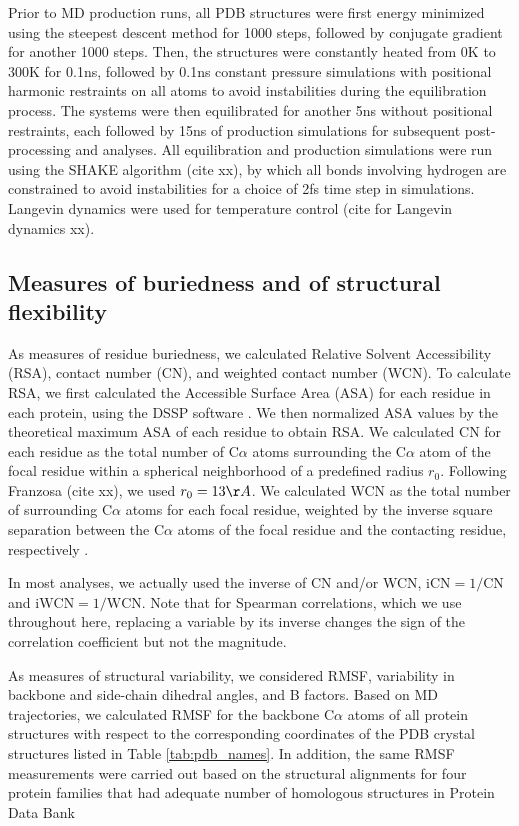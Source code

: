 \documentclass[12pt]{article}
\begin{document}
Prior to MD production runs, all PDB structures were first energy minimized using the steepest descent method for 1000 steps, followed by conjugate gradient for another 1000 steps. Then, the structures were constantly heated from 0K to 300K for 0.1ns, followed by 0.1ns constant pressure simulations with positional harmonic restraints on all atoms to avoid instabilities during the equilibration process. The systems were then equilibrated for another 5ns without positional restraints, each followed by 15ns of production simulations for subsequent post-processing and analyses. All equilibration and production simulations were run using the SHAKE algorithm (cite xx), {\color{blue}by which all bonds involving hydrogen are constrained to avoid instabilities for a choice of 2fs time step in simulations.} Langevin dynamics were used for temperature control (cite for Langevin dynamics xx).

\subsection*{Measures of buriedness and of structural flexibility}

As measures of residue buriedness, we calculated Relative Solvent Accessibility (RSA), contact number (CN), and weighted contact number (WCN). To calculate RSA, we first calculated the Accessible Surface Area (ASA) for each residue in each protein, using the DSSP software \citep{KabschSander1983}. We then normalized ASA values by the theoretical maximum ASA of each residue \citep{Tienetal2013} to obtain RSA. We calculated CN for each residue as the total number of C$\alpha$ atoms surrounding the  C$\alpha$ atom of the focal residue within a spherical neighborhood of a predefined radius $r_0$. Following Franzosa (cite xx), we used $r_0=13\AA$. We calculated WCN as the total number of surrounding C$\alpha$ atoms for each focal residue, weighted by the inverse square separation between the C$\alpha$ atoms of the focal residue and the contacting residue, respectively \citep{Shihetal2012}.

In most analyses, we actually used the inverse of CN and/or WCN, $\text{iCN}=1/\text{CN}$ and $\text{iWCN}=1/\text{WCN}$. Note that for Spearman correlations, which we use throughout here, replacing a variable by its inverse changes the sign of the correlation coefficient but not the magnitude.

As measures of structural variability, we considered RMSF, variability in backbone and side-chain dihedral angles, and B factors. {\color{blue}Based on MD trajectories, we calculated RMSF for the backbone C$\alpha$ atoms of all protein structures with respect to the corresponding coordinates of the PDB crystal structures listed in Table \ref{tab:pdb_names}. In addition, the same RMSF measurements were carried out based on the structural alignments for four protein families that had adequate number of homologous structures in Protein Data Bank}
\end{document}
